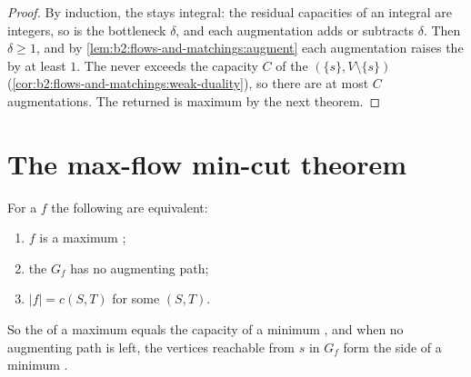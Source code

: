 \begin{proof}
By induction, the  stays integral: the residual capacities of an integral  are integers, so is the bottleneck
$\delta$, and each augmentation adds or subtracts $\delta$. Then $\delta \geq 1$, and by \cref{lem:b2:flows-and-matchings:augment}
each augmentation raises the  by at least $1$. The  never exceeds the capacity $C$ of the  $(\{s\}, V
\setminus \{s\})$ (\cref{cor:b2:flows-and-matchings:weak-duality}), so there are at most $C$ augmentations. The 
returned is maximum by the next theorem.
\end{proof}

\section{The max-flow min-cut theorem}\label{sec:b2:flows-and-matchings:maxflow-mincut}

\begin{theorem}\label{thm:b2:flows-and-matchings:maxflow-mincut}
For a  $f$ the following are equivalent:
\begin{enumerate}
\item $f$ is a maximum ;
\item the  $G_f$ has no augmenting path;
\item $|f| = c(S, T)$ for some  $(S, T)$.
\end{enumerate}
So the  of a maximum  equals the capacity of a minimum , and when no augmenting path is left, the vertices
reachable from $s$ in $G_f$ form the  side of a minimum .
\end{theorem}

